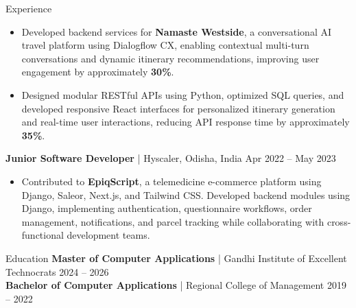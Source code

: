 \documentclass{resume}
\begin{document}
\begin{rSection}{Experience}
\begin{itemize}
\item Developed backend services for \textbf{Namaste Westside}, a conversational AI travel platform using Dialogflow CX, enabling contextual multi-turn conversations and dynamic itinerary recommendations, improving user engagement by approximately \textbf{30\%}.

\item Designed modular RESTful APIs using Python, optimized SQL queries, and developed responsive React interfaces for personalized itinerary generation and real-time user interactions, reducing API response time by approximately \textbf{35\%}.

\end{itemize}

\textbf{Junior Software Developer} | Hyscaler, Odisha, India \hfill Apr 2022 -- May 2023
\begin{itemize}
\item Contributed to \textbf{EpiqScript}, a telemedicine e-commerce platform using Django, Saleor, Next.js, and Tailwind CSS. Developed backend modules using Django, implementing authentication, questionnaire workflows, order management, notifications, and parcel tracking while collaborating with cross-functional development teams.
\end{itemize}

\end{rSection}

\vspace{-0.1em}
\begin{rSection}{Education}
\textbf{Master of Computer Applications} | Gandhi Institute of Excellent Technocrats \hfill 2024 -- 2026 \\
\textbf{Bachelor of Computer Applications} | Regional College of Management \hfill 2019 -- 2022
\end{rSection}
\end{document}
